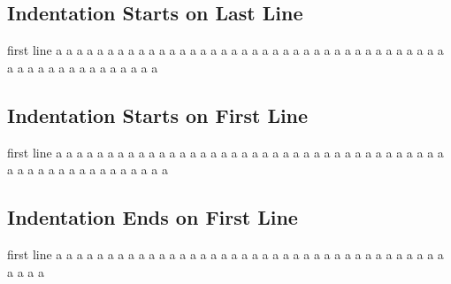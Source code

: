 \documentclass[a4paper]{article}
\begin{document}
	\subsection{Indentation Starts on Last Line}
	\begin{algorithmic}[1]
		\State first line
			\State a
			\State a
			\State a
			\State a
			\State a
			\State a
			\State a
			\State a
			\State a
			\State a
			\State a
			\State a
			\State a
			\State a
			\State a
			\State a
			\State a
			\State a
			\State a
			\State a
			\State a
			\State a
			\State a
			\State a
			\State a
			\State a
			\State a
			\State a
			\State a
			\State a
			\State a
			\State a
			\State a
			\State a
			\State a
			\State a
			\State a
			\State a
			\State a
			\State a
			\State a
			\State a
			\State a
			\State a
			\State a
				\State a
				\State a
				\State a
					\State a
					\State a
					\State a
					\State a
					\State a
				\EndIf
			\EndIf
		\EndIf
	\end{algorithmic}

	\newpage
	\subsection{Indentation Starts on First Line}
	\begin{algorithmic}[1]
		\State first line
			\State a
			\State a
			\State a
			\State a
			\State a
			\State a
			\State a
			\State a
			\State a
			\State a
			\State a
			\State a
			\State a
			\State a
			\State a
			\State a
			\State a
			\State a
			\State a
			\State a
			\State a
			\State a
			\State a
			\State a
			\State a
			\State a
			\State a
			\State a
			\State a
			\State a
			\State a
			\State a
			\State a
			\State a
			\State a
			\State a
			\State a
			\State a
			\State a
			\State a
			\State a
			\State a
			\State a
			\State a
			\State a
			\State a
				\State a
				\State a
				\State a
					\State a
					\State a
					\State a
					\State a
					\State a
				\EndIf
			\EndIf
		\EndIf
	\end{algorithmic}

	\newpage
	\subsection{Indentation Ends on First Line}
	\begin{algorithmic}[1]
		\State first line
			\State a
			\State a
			\State a
			\State a
			\State a
			\State a
			\State a
			\State a
			\State a
			\State a
			\State a
			\State a
			\State a
			\State a
			\State a
			\State a
			\State a
			\State a
			\State a
			\State a
			\State a
			\State a
			\State a
			\State a
			\State a
			\State a
			\State a
			\State a
			\State a
			\State a
			\State a
			\State a
			\State a
			\State a
			\State a
			\State a
				\State a
				\State a
				\State a
						\State a
						\State a
						\State a
					\EndIf
				\EndIf
			\EndIf
		\EndIf
	\end{algorithmic}
\end{document}
